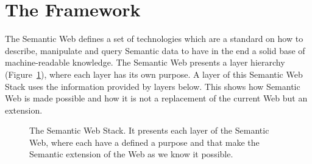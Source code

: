 \section{The Framework}

The Semantic Web defines a set of technologies which are a standard on how to
describe, manipulate and query Semantic data to have in the end a solid base of
machine-readable knowledge. The Semantic Web presents a layer hierarchy
(Figure~\ref{fig:sw-stack}), where each layer has its own purpose. A layer of
this Semantic Web Stack uses the information provided by layers below. This
shows how Semantic Web is made possible and how it is not a replacement of the
current Web but an extension.

\begin{figure}
\centering
{}%
\caption{The Semantic Web Stack. It presents each layer of the Semantic Web,
where each have a defined a purpose and that make the Semantic extension of the
Web as we know it possible.}
\label{fig:sw-stack}
\end{figure}

